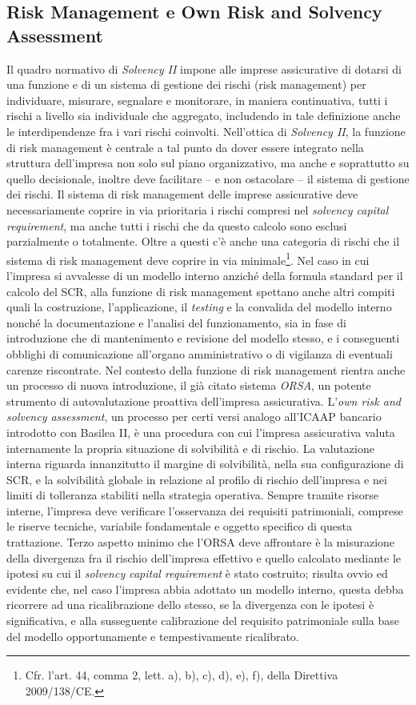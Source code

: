 \subsection{Risk Management e Own Risk and Solvency Assessment}
Il quadro normativo di \textit{\textit{Solvency I}I} impone alle imprese assicurative di dotarsi di una funzione e di un sistema di gestione dei rischi (risk management) per individuare, misurare, segnalare e monitorare, in maniera continuativa, tutti i rischi a livello sia individuale che aggregato, includendo in tale definizione anche le interdipendenze fra i vari rischi coinvolti.
Nell’ottica di \textit{\textit{Solvency I}I}, la funzione di risk management è centrale a tal punto da dover essere integrato nella struttura dell’impresa non solo sul piano organizzativo, ma anche e soprattutto su quello decisionale, inoltre deve facilitare – e non ostacolare – il sistema di gestione dei rischi.
Il sistema di risk management delle imprese assicurative deve necessariamente coprire in via prioritaria i rischi compresi nel {\itshape solvency capital requirement}, ma anche tutti i rischi che da questo calcolo sono esclusi parzialmente o totalmente. Oltre a questi c’è anche una categoria di rischi che il sistema di risk management deve coprire in via minimale\footnote{Cfr. l’art. 44, comma 2, lett. a), b), c), d), e), f), della Direttiva 2009/138/CE.}.
Nel caso in cui l’impresa si avvalesse di un modello interno anziché della formula standard per il calcolo del SCR, alla funzione di risk management spettano anche altri compiti quali la costruzione, l’applicazione, il {\itshape testing} e la convalida del modello interno nonché la documentazione e l’analisi del funzionamento, sia in fase di introduzione che di mantenimento e revisione del modello stesso, e i conseguenti obblighi di comunicazione all’organo amministrativo o di vigilanza di eventuali carenze riscontrate.
Nel contesto della funzione di risk management rientra anche un processo di nuova introduzione, il già citato sistema \textit{ORSA}, un potente strumento di autovalutazione proattiva dell’impresa assicurativa.
L’{\itshape own risk and solvency assessment}, un processo per certi versi analogo all’ICAAP bancario introdotto con Basilea II, è una procedura con cui l’impresa assicurativa valuta internamente la propria situazione di solvibilità e di rischio. La valutazione interna riguarda innanzitutto il margine di solvibilità, nella sua configurazione di SCR, e la solvibilità globale in relazione al profilo di rischio dell’impresa e nei limiti di tolleranza stabiliti nella strategia operativa. Sempre tramite risorse interne, l’impresa deve verificare l’osservanza dei requisiti patrimoniali, comprese le riserve tecniche, variabile fondamentale e oggetto specifico di questa trattazione. Terzo aspetto minimo che l’ORSA deve affrontare è la misurazione della divergenza fra il rischio dell’impresa effettivo e quello calcolato mediante le ipotesi su cui il {\itshape solvency capital requirement} è stato costruito; risulta ovvio ed evidente che, nel caso l’impresa abbia adottato un modello interno, questa debba ricorrere ad una ricalibrazione dello stesso, se la divergenza con le ipotesi è significativa, e alla susseguente calibrazione del requisito patrimoniale sulla base del modello opportunamente e tempestivamente ricalibrato.
